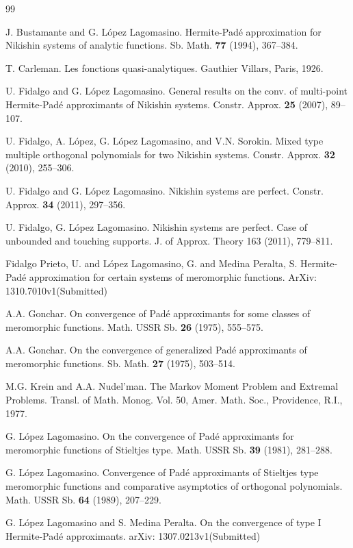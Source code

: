 \documentclass[10pt,a4paper]{article}
\theoremstyle{definition}
\theoremstyle{remark}
\numberwithin{equation}{section}
\begin{document}
\begin{thebibliography}{99}

 J. Bustamante and G. L\'opez Lagomasino. Hermite-Pad\'e  approximation for Nikishin systems of analytic functions. Sb. Math. {\bf 77} (1994), 367--384.

 T. Carleman. Les fonctions quasi-analytiques. Gauthier Villars, Paris, 1926.

 U. Fidalgo and G. L\'opez Lagomasino. General results on the conv. of multi-point Hermite-Pad\'e approximants of Nikishin systems. Constr. Approx. {\bf 25} (2007), 89--107.

 U. Fidalgo, A. L\'opez, G. L\'opez Lagomasino, and V.N. Sorokin. Mixed type multiple orthogonal polynomials for two Nikishin systems. Constr. Approx. {\bf 32} (2010), 255--306.

 U. Fidalgo and G. L\'opez Lagomasino. Nikishin systems are perfect. Constr. Approx. {\bf 34} (2011), 297--356.

  U. Fidalgo, G. L\'opez Lagomasino.  Nikishin systems are perfect. Case of unbounded and touching supports. J. of Approx. Theory  163 (2011), 779--811.

Fidalgo Prieto, U. and L{\'o}pez Lagomasino, G. and  Medina Peralta, S. Hermite-Pad\'e approximation for certain systems of meromorphic functions. ArXiv: 1310.7010v1(Submitted)


 A.A. Gonchar. On convergence of Pad\'e approximants for some classes of meromorphic functions.  Math. USSR Sb. {\bf 26} (1975), 555--575.

 A.A. Gonchar.  On the convergence of generalized
Pad\'e approximants of meromorphic functions. Sb. Math. {\bf 27} (1975),
503--514.

 M.G. Krein and A.A. Nudel'man. The Markov Moment Problem and Extremal Problems. Transl. of Math. Monog. Vol. 50, Amer. Math. Soc., Providence, R.I., 1977.

 G. L\'opez Lagomasino.  On the convergence of Pad\'e approximants for  meromorphic functions of Stieltjes type.  Math. USSR Sb. {\bf 39} (1981), 281--288.

 G. L\'opez Lagomasino.  Convergence of Pad\'e approximants of Stieltjes type meromorphic functions and comparative asymptotics of orthogonal polynomials.  Math. USSR Sb. {\bf 64} (1989), 207--229.

 G. L\'opez Lagomasino and S. Medina Peralta.  On the convergence of type I Hermite-Pad\'e approximants. arXiv: 1307.0213v1(Submitted)


\end{thebibliography}
\end{document}
